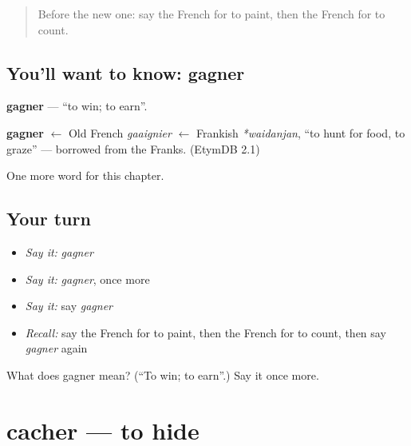 \label{lesson:FR-C66-gagner}



\begin{quote}
Before the new one: say the French for to paint, then the French for to count.
\end{quote}

\subsection*{You'll want to know: gagner}
\textbf{gagner} — \textquotedblleft{}to win; to earn\textquotedblright{}.

\begin{cousinweb}
\textbf{gagner} $\leftarrow$ Old French \emph{gaaignier} $\leftarrow$ Frankish \emph{*waidanjan}, \textquotedblleft{}to hunt for food, to graze\textquotedblright{} — borrowed from the Franks. (EtymDB 2.1)
\end{cousinweb}

\begin{grammarlens}[title={What you've built}]
One more word for this chapter.
\end{grammarlens}

\subsection*{Your turn}
\begin{itemize}
\raggedright
  \item \emph{Say it:} \emph{gagner}
  \item \emph{Say it:} \emph{gagner}, once more
  \item \emph{Say it:} say \emph{gagner}
  \item \emph{Recall:} say the French for to paint, then the French for to count, then say \emph{gagner} again
\end{itemize}

\begin{tcolorbox}[breakable,colback=teal!4,colframe=teal!35!black,title={Before you move on}]
What does gagner mean? (\textquotedblleft{}To win; to earn\textquotedblright{}.) Say it once more.
\end{tcolorbox}
\section[cacher]{cacher — to hide}

\label{lesson:FR-C66-cacher}



